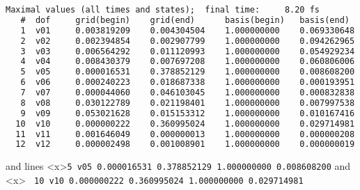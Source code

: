 \clearpage
\begin{lstlisting}[frame=single, language=xml]
 Maximal values (all times and states);  final time:     8.20 fs
   #  dof     grid(begin)    grid(end)      basis(begin)   basis(end)
   1  v01     0.003819209    0.004304504    1.000000000    0.069330648
   2  v02     0.002394854    0.002907799    1.000000000    0.094262965
   3  v03     0.006564292    0.011120993    1.000000000    0.054929234
   4  v04     0.008430379    0.007697208    1.000000000    0.060806006
   5  v05     0.000016531    0.378852129    1.000000000    0.008608200
   6  v06     0.000240223    0.018687338    1.000000000    0.000193951
   7  v07     0.000044060    0.046103045    1.000000000    0.000832838
   8  v08     0.030122789    0.021198401    1.000000000    0.007997538
   9  v09     0.053021628    0.015153312    1.000000000    0.010167416
  10  v10     0.000000222    0.360995024    1.000000000    0.029714981
  11  v11     0.001646049    0.000000013    1.000000000    0.000000208
  12  v12     0.000002498    0.001008901    1.000000000    0.000000019
\end{lstlisting}

and lines <x>\texttt{5  v05     0.000016531    0.378852129    1.000000000    0.008608200} and <x> \texttt{ 10  v10     0.000000222    0.360995024    1.000000000    0.029714981}




